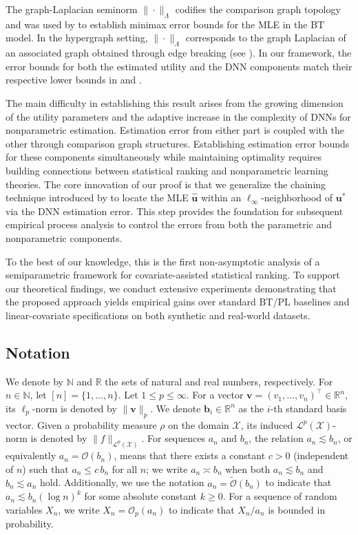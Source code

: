 \documentclass[
  12pt]{article}
\begin{document}
The graph-Laplacian seminorm $\|\cdot\|_\Lambda$ codifies the comparison graph topology and was used by \citet{shah2016estimation} to establish minimax error bounds for the MLE in the BT model. In the hypergraph setting, $\|\cdot\|_\Lambda$ corresponds to the graph Laplacian of an associated graph obtained through edge breaking (see ). In our framework, the error bounds for both the estimated utility and the DNN components match their respective lower bounds in \citet[Theorem 1]{shah2016estimation} and \citet[Theorem 1]{stone1982optimal}.

The main difficulty in establishing this result arises from the growing dimension of the utility parameters and the adaptive increase in the complexity of DNNs for nonparametric estimation. Estimation error from either part is coupled with the other through comparison graph structures. Establishing estimation error bounds for these components simultaneously while maintaining optimality requires building connections between statistical ranking and nonparametric learning theories. The core innovation of our proof is that we generalize the chaining technique introduced by \citet{han2023general} to locate the MLE $\widehat{\bm u}$ within an $\ell_\infty$-neighborhood of $\bm u^*$ via the DNN estimation error. This step provides the foundation for subsequent empirical process analysis to control the errors from both the parametric and nonparametric components.

To the best of our knowledge, this is the first non-asymptotic analysis of a semiparametric framework for covariate-assisted statistical ranking. To support our theoretical findings, we conduct extensive experiments demonstrating that the proposed approach yields empirical gains over standard BT/PL baselines and linear-covariate specifications on both synthetic and real-world datasets. 

\subsection{Notation}

We denote by $\mathbb{N}$ and $\mathbb{R}$ the sets of natural and real numbers, respectively. For $n\in\mathbb{N}$, let $[n]=\{1,\ldots,n\}$. Let $1\leq p\leq\infty$. For a vector $\boldsymbol{v}=(v_1,\ldots,v_n)^\top\in\mathbb{R}^n$, its $\ell_p$-norm is
denoted by $\|\boldsymbol{v}\|_p$. We denote $\mathbf{b}_i \in \mathbb{R}^n$ as the $i$-th standard basis vector.
Given a probability measure $\rho$ on the domain $\mathcal{X}$, its induced $\mathcal{L}^p(\mathcal{X})$-norm is denoted by $\|f\|_{\mathcal{L}^p(\mathcal{X})}$. For sequences $a_n$ and $b_n$, the relation $a_n \lesssim b_n$, or equivalently $a_n = \mathcal{O}(b_n)$, means that there exists a constant $c>0$ (independent of $n$) such that $a_n \le c\,b_n$ for all $n$; we write $a_n \asymp b_n$ when both $a_n \lesssim b_n$ and $b_n \lesssim a_n$ hold. Additionally, we use the notation $a_n = \widetilde{\mathcal{O}}(b_n)$ to indicate that $a_n \lesssim b_n (\log n)^k$ for some absolute constant $k \ge 0$. For a sequence of random variables $X_n$, we write $X_n = \mathcal{O}_p(a_n)$ to indicate that $X_n/a_n$ is bounded in probability.
\end{document}
